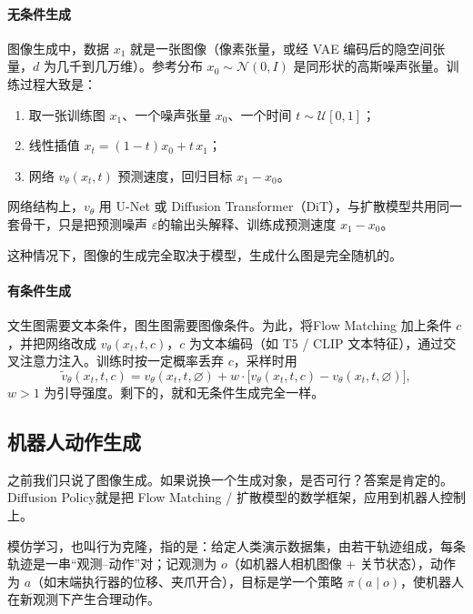 \paragraph{无条件生成}

图像生成中，数据 $x_1$ 就是一张图像（像素张量，或经 VAE 编码后的隐空间张量，$d$ 为几千到几万维）。参考分布 $x_0\sim\mathcal N(0,I)$ 是同形状的高斯噪声张量。训练过程大致是：
\begin{enumerate}
\item 取一张训练图 $x_1$、一个噪声张量 $x_0$、一个时间 $t\sim\mathcal U[0,1]$；
\item 线性插值 $x_t=(1-t)x_0+t\,x_1$；
\item 网络 $v_\theta(x_t,t)$ 预测速度，回归目标 $x_1-x_0$。
\end{enumerate}

网络结构上，$v_\theta$ 用 U-Net 或 Diffusion Transformer（DiT），与扩散模型共用同一套骨干，只是把预测噪声 $\varepsilon$的输出头解释、训练成预测速度 $x_1-x_0$。

这种情况下，图像的生成完全取决于模型，生成什么图是完全随机的。

\paragraph{有条件生成}

文生图需要文本条件，图生图需要图像条件。为此，将Flow Matching 加上条件 $c$，并把网络改成 $v_\theta(x_t,t,c)$，$c$ 为文本编码（如 T5 / CLIP 文本特征），通过交叉注意力注入。训练时按一定概率丢弃 $c$，采样时用
\begin{equation}
\tilde v_\theta(x_t,t,c) = v_\theta(x_t,t,\varnothing) + w\cdot\big[v_\theta(x_t,t,c) - v_\theta(x_t,t,\varnothing)\big],
\end{equation}
$w>1$ 为引导强度。剩下的，就和无条件生成完全一样。

\subsection{机器人动作生成}

之前我们只说了图像生成。如果说换一个生成对象，是否可行？答案是肯定的。Diffusion Policy\cite{chi2024diffusionpolicyvisuomotorpolicy}就是把 Flow Matching / 扩散模型的数学框架，应用到机器人控制上。

模仿学习，也叫行为克隆，指的是：给定人类演示数据集，由若干轨迹组成，每条轨迹是一串“观测–动作”对；记观测为 $o$（如机器人相机图像 + 关节状态），动作为 $a$（如末端执行器的位移、夹爪开合），目标是学一个策略 $\pi(a\mid o)$，使机器人在新观测下产生合理动作。

